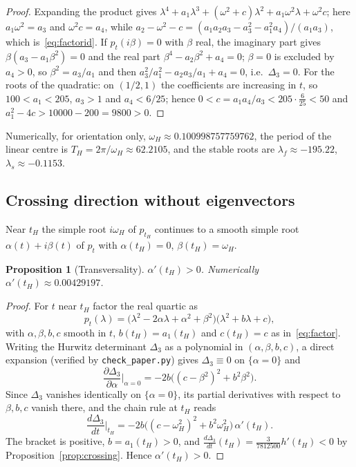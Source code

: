 \documentclass[11pt,a4paper]{article}
\theoremstyle{plain}
\newtheorem{proposition}[theorem]{Proposition}
\theoremstyle{definition}
\theoremstyle{remark}
\begin{document}
\begin{proof}
Expanding the product gives $\lambda^4+a_1\lambda^3+(\omega^2+c)\lambda^2+a_1\omega^2\lambda+\omega^2c$; here $a_1\omega^2=a_3$ and $\omega^2c=a_4$, while $a_2-\omega^2-c=(a_1a_2a_3-a_3^2-a_1^2a_4)/(a_1a_3)$, which is~\eqref{eq:factorid}. If $p_t(i\beta)=0$ with $\beta$ real, the imaginary part gives $\beta(a_3-a_1\beta^2)=0$ and the real part $\beta^4-a_2\beta^2+a_4=0$; $\beta=0$ is excluded by $a_4>0$, so $\beta^2=a_3/a_1$ and then $a_3^2/a_1^2-a_2a_3/a_1+a_4=0$, i.e.\ $\Delta_3=0$. For the roots of the quadratic: on $(1/2,1)$ the coefficients are increasing in $t$, so $100<a_1<205$, $a_3>1$ and $a_4<6/25$; hence $0<c=a_1a_4/a_3<205\cdot\frac{6}{25}<50$ and $a_1^2-4c>10000-200=9800>0$.
\end{proof}

Numerically, for orientation only, $\omega_H\approx0.100998757759762$, the period of the linear centre is $T_H=2\pi/\omega_H\approx62.2105$, and the stable roots are $\lambda_f\approx-195.22$, $\lambda_s\approx-0.1153$.

\subsection{Crossing direction without eigenvectors}

Near $t_H$ the simple root $i\omega_H$ of $p_{t_H}$ continues to a smooth simple root $\alpha(t)+i\beta(t)$ of $p_t$ with $\alpha(t_H)=0$, $\beta(t_H)=\omega_H$.

\begin{proposition}[Transversality]\label{prop:transversal}
$\alpha'(t_H)>0$. Numerically $\alpha'(t_H)\approx0.00429197$.
\end{proposition}

\begin{proof}
For $t$ near $t_H$ factor the real quartic as
\[
p_t(\lambda)=\bigl(\lambda^2-2\alpha\lambda+\alpha^2+\beta^2\bigr)\bigl(\lambda^2+b\lambda+c\bigr),
\]
with $\alpha,\beta,b,c$ smooth in $t$, $b(t_H)=a_1(t_H)$ and $c(t_H)=c$ as in~\eqref{eq:factor}. Writing the Hurwitz determinant $\Delta_3$ as a polynomial in $(\alpha,\beta,b,c)$, a direct expansion (verified by \texttt{check\_paper.py}) gives $\Delta_3\equiv0$ on $\{\alpha=0\}$ and
\[
\frac{\partial\Delta_3}{\partial\alpha}\Big|_{\alpha=0}=-2b\bigl((c-\beta^2)^2+b^2\beta^2\bigr).
\]
Since $\Delta_3$ vanishes identically on $\{\alpha=0\}$, its partial derivatives with respect to $\beta,b,c$ vanish there, and the chain rule at $t_H$ reads
\[
\frac{d\Delta_3}{dt}\Big|_{t_H}=-2b\bigl((c-\omega_H^2)^2+b^2\omega_H^2\bigr)\,\alpha'(t_H).
\]
The bracket is positive, $b=a_1(t_H)>0$, and $\frac{d\Delta_3}{dt}(t_H)=\frac{3}{7812500}h'(t_H)<0$ by Proposition~\ref{prop:crossing}. Hence $\alpha'(t_H)>0$.
\end{proof}
\end{document}
